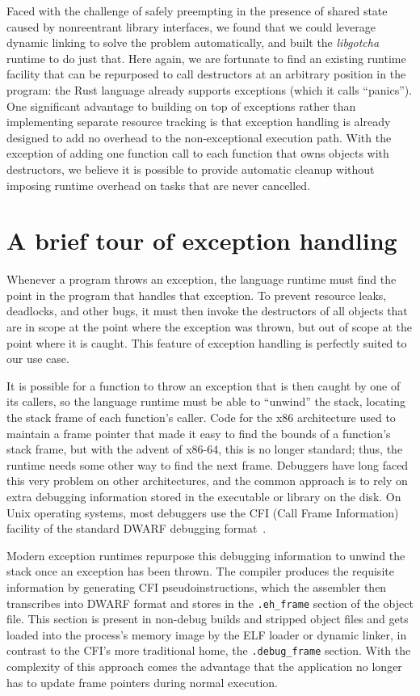 Faced with the challenge of safely preempting in the presence of shared state caused
by nonreentrant library interfaces, we found that we could leverage dynamic linking
to solve the problem automatically, and built the \textit{libgotcha} runtime to do
just that.  Here again, we are fortunate to find an existing runtime facility that
can be repurposed to call destructors at an arbitrary position in the program:\@
the Rust language already supports exceptions (which it calls ``panics'').  One
significant advantage to building on top of exceptions rather than implementing
separate resource tracking is that exception handling is already designed to add no
overhead to the non-exceptional execution path.  With the exception of adding one
function call to each function that owns objects with destructors, we believe it is
possible to provide automatic cleanup without imposing runtime overhead on tasks that
are never cancelled.


\section{A brief tour of exception handling}

Whenever a program throws an exception, the language runtime must find the point in
the program that handles that exception.  To prevent resource leaks, deadlocks, and
other bugs, it must then invoke the destructors of all objects that are in scope at
the point where the exception was thrown, but out of scope at the point where it is
caught.  This feature of exception handling is perfectly suited to our use case.

It is possible for a function to throw an exception that is then caught by one of its
callers, so the language runtime must be able to ``unwind'' the stack, locating the
stack frame of each function's caller.  Code for the x86 architecture used to
maintain a frame pointer that made it easy to find the bounds of a function's stack
frame, but with the advent of x86-64, this is no longer standard; thus, the runtime
needs some other way to find the next frame.  Debuggers have long faced this very
problem on other architectures, and the common approach is to rely on extra debugging
information stored in the executable or library on the disk.  On Unix operating
systems, most debuggers use the CFI (Call Frame Information) facility of the standard
DWARF debugging format~\cite{eager:spec2012}.

Modern exception runtimes repurpose this debugging information to unwind the stack
once an exception has been thrown.  The compiler produces the requisite information
by generating CFI pseudoinstructions, which the assembler then transcribes into DWARF
format and stores in the \texttt{.eh\_frame} section of the object file.  This
section is present in non-debug builds and stripped object files and gets loaded into
the process's memory image by the ELF loader or dynamic linker, in contrast to the
CFI's more traditional home, the \texttt{.debug\_frame} section.  With the complexity
of this approach comes the advantage that the application no longer has to update
frame pointers during normal execution.

